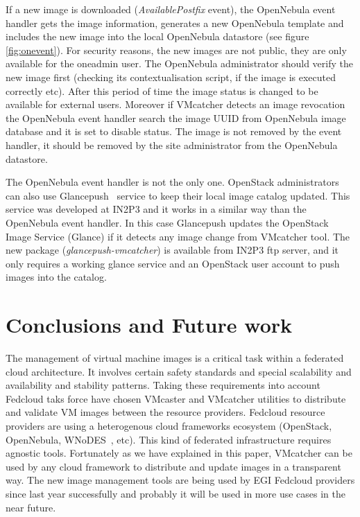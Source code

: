 \documentclass{llncs_Ibergrid2013}
\begin{document}
If a new image is downloaded (\textit{AvailablePostfix} event), the OpenNebula event handler gets the image information, generates a new OpenNebula template and includes the new image into the local OpenNebula datastore (see figure \ref{fig:onevent}). 
For security reasons, the new images are not public, they are only available for the oneadmin user. The OpenNebula administrator should verify the new image first (checking its contextualisation script, if the image is executed correctly etc).
After this period of time the image status is changed to be available for external users. 
Moreover if VMcatcher detects an image revocation the OpenNebula event handler search the image UUID from OpenNebula image database and it is set to disable status.
The image is not removed by the event handler, it should be removed by the site administrator from the OpenNebula datastore.

The OpenNebula event handler is not the only one. OpenStack administrators can also use Glancepush~\cite{glancepush} service to keep their local image catalog updated. 
This service was developed at IN2P3 and it works in a similar way than the OpenNebula event handler. 
In this case Glancepush updates the OpenStack Image Service (Glance) if it detects any image change from VMcatcher tool. 
The new package (\textit{glancepush-vmcatcher}) is available from IN2P3 ftp server, and it only requires a working glance service and an OpenStack user account to push images into the catalog.


\section{Conclusions and Future work}
\label{sect-conclusions}
The management of virtual machine images is a critical task within a federated cloud architecture. It involves certain safety standards and special scalability and availability and stability patterns.
Taking these requirements into account Fedcloud taks force have chosen VMcaster and VMcatcher utilities to distribute and validate VM images between the resource providers.
Fedcloud resource providers are using a heterogenous cloud frameworks ecosystem (OpenStack, OpenNebula, WNoDES~\cite{wnodes}, etc). This kind of federated infrastructure requires agnostic tools.
Fortunately as we have explained in this paper, VMcatcher can be used by any cloud framework to distribute and update images in a transparent way. 
The new image management tools are being used by EGI Fedcloud providers since last year successfully and probably it will be used in more use cases in the near future.
\end{document}
